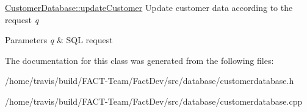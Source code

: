 \hyperlink{classDatabases_1_1CustomerDatabase_a83493698214a2e8e68024d007e715f35}{Customer\-Database\-::update\-Customer} Update customer data according to the request {\itshape q} 


\begin{DoxyParams}{Parameters}
{\em q} & S\-Q\-L request \\
\hline
\end{DoxyParams}


The documentation for this class was generated from the following files\-:\begin{DoxyCompactItemize}
\item 
/home/travis/build/\-F\-A\-C\-T-\/\-Team/\-Fact\-Dev/src/database/customerdatabase.\-h\item 
/home/travis/build/\-F\-A\-C\-T-\/\-Team/\-Fact\-Dev/src/database/customerdatabase.\-cpp\end{DoxyCompactItemize}
